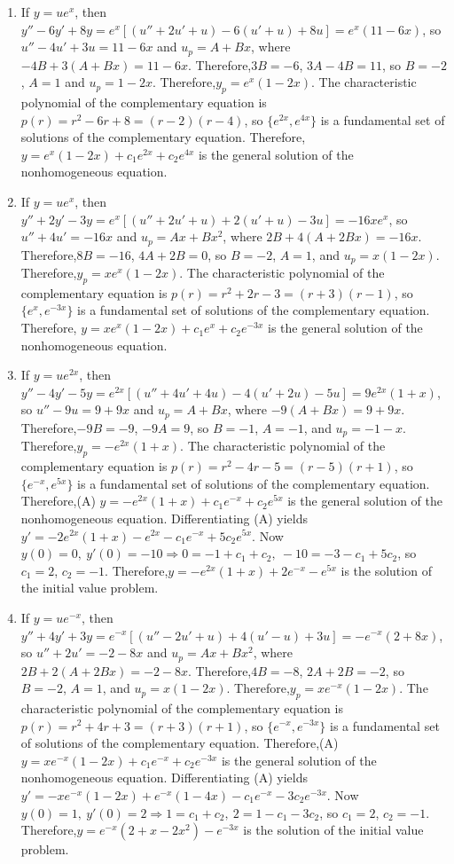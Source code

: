 \documentclass[openany]{book}
\newenvironment{sectionSolutions}{
 \begin{enumerate}[item-label={\thesection.\arabic{enumi}.}]
}{
 \end{enumerate}
}
\begin{document}
\begin{sectionSolutions}
\item
If $y=ue^x$, then $y''-6y'+8y=e^x\left[(u''+2u'+u)-6(u'+u)+8u\right]=
e^x(11-6x)$, so $u''-4u'+3u =11-6x$ and $u_p=A+Bx$, where
$-4B+3(A+Bx)=11-6x$. Therefore,$3B=-6$, $3A-4B=11$, so $B=-2$, $A=1$
and $u_p=1-2x$. Therefore,$y_p=e^x(1-2x)$. The characteristic
polynomial of the complementary equation is
$p(r)=r^2-6r+8=(r-2)(r-4)$, so $\{e^{2x},e^{4x}\}$ is a fundamental
set of solutions of the complementary equation. Therefore,
$y=e^x(1-2x)+c_1e^{2x}+c_2e^{4x}$ is the general solution of the
nonhomogeneous equation.


\item
If $y=ue^x$, then $y''+2y'-3y=e^x\left[(u''+2u'+u)+2(u'+u)-3u\right]=
-16xe^x$, so $u''+4u'=-16x$ and $u_p=Ax+Bx^2$, where
$2B+4(A+2Bx)=-16x$. Therefore,$8B=-16$, $4A+2B=0$, so $B=-2$, $A=1$,
and $u_p=x(1-2x)$. Therefore,$y_p=xe^x(1-2x)$. The characteristic
polynomial of the complementary equation is
$p(r)=r^2+2r-3=(r+3)(r-1)$, so $\{e^x,e^{-3x}\}$ is a fundamental set
of solutions of the complementary equation. Therefore,
$y=xe^x(1-2x)+c_1e^x+c_2e^{-3x}$ is the general solution of the
nonhomogeneous equation.


\item
If $y=ue^{2x}$, then
$y''-4y'-5y=e^{2x}\left[(u''+4u'+4u)-4(u'+2u)-5u\right]=
9e^{2x}(1+x)$, so $u''-9u =9+9x$ and $u_p=A+Bx$, where
$-9(A+Bx)=9+9x$. Therefore,$-9B=-9$, $-9A=9$, so $B=-1$, $A=-1$, and
$u_p=-1-x$. Therefore,$y_p=-e^{2x}(1+x)$. The characteristic
polynomial of the complementary equation is
$p(r)=r^2-4r-5=(r-5)(r+1)$, so $\{e^{-x},e^{5x}\}$ is a fundamental
set of solutions of the complementary equation. Therefore,(A)
$y=-e^{2x}(1+x)+c_1e^{-x}+c_2e^{5x}$ is the general solution of the
nonhomogeneous equation. Differentiating (A) yields
$y'=-2e^{2x}(1+x)-e^{2x}-c_1e^{-x}+5c_2e^{5x}$. Now $y(0)=0,\
y'(0)=-10\Rightarrow 0=-1+c_1+c_2,\ -10=-3-c_1+5c_2$, so $c_1=2$,
$c_2=-1$. Therefore,$y=-e^{2x}(1+x)+2e^{-x}-e^{5x}$ is the solution of
the initial value problem.


\item
If $y=ue^{-x}$, then
$y''+4y'+3y=e^{-x}\left[(u''-2u'+u)+4(u'-u)+3u\right]= -e^{-x}(2+8x)$,
so $u''+2u'=-2-8x$ and $u_p=Ax+Bx^2$, where $2B+2(A+2Bx)=-2-8x$.
Therefore,$4B=-8$, $2A+2B=-2$, so $B=-2$, $A=1$, and $u_p=x(1-2x)$.
Therefore,$y_p=xe^{-x}(1-2x)$. The characteristic polynomial of the
complementary equation is $p(r)=r^2+4r+3=(r+3)(r+1)$, so
$\{e^{-x},e^{-3x}\}$ is a fundamental set of solutions of the
complementary equation. Therefore,(A)
$y=xe^{-x}(1-2x)+c_1e^{-x}+c_2e^{-3x}$ is the general solution of the
nonhomogeneous equation. Differentiating (A) yields
$y'=-xe^{-x}(1-2x)+e^{-x}(1-4x)-c_1e^{-x}-3c_2e^{-3x}$. Now $y(0)=1,\
y'(0)=2\Rightarrow 1=c_1+c_2,\ 2=1-c_1-3c_2$, so $c_1=2$, $c_2=-1$.
Therefore,$y=e^{-x}(2+x-2x^2)-e^{-3x}$ is the solution of the initial
value problem.



\end{sectionSolutions}
\end{document}
